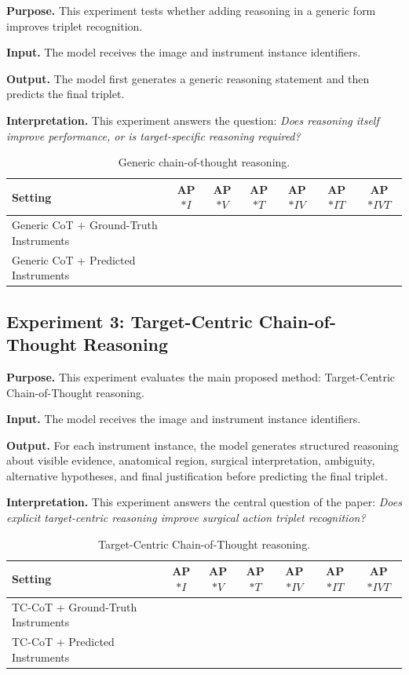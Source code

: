 \documentclass[11pt]{article}
\begin{document}
\textbf{Purpose.}
This experiment tests whether adding reasoning in a generic form improves triplet recognition.

\textbf{Input.}
The model receives the image and instrument instance identifiers.

\textbf{Output.}
The model first generates a generic reasoning statement and then predicts the final triplet.

\textbf{Interpretation.}
This experiment answers the question: \emph{Does reasoning itself improve performance, or is target-specific reasoning required?}

\begin{table}[H]
\centering
\caption{Generic chain-of-thought reasoning.}
\begin{tabular}{lcccccc}
\toprule
Setting & AP$*I$ & AP$*V$ & AP$*T$ & AP$*{IV}$ & AP$*{IT}$ & AP$*{IVT}$ \\
\midrule
Generic CoT + Ground-Truth Instruments & & & & & & \\
Generic CoT + Predicted Instruments & & & & & & \\
\bottomrule
\end{tabular}
\label{tab:generic_cot}
\end{table}

\subsection{Experiment 3: Target-Centric Chain-of-Thought Reasoning}

\textbf{Purpose.}
This experiment evaluates the main proposed method: Target-Centric Chain-of-Thought reasoning.

\textbf{Input.}
The model receives the image and instrument instance identifiers.

\textbf{Output.}
For each instrument instance, the model generates structured reasoning about visible evidence, anatomical region, surgical interpretation, ambiguity, alternative hypotheses, and final justification before predicting the final triplet.

\textbf{Interpretation.}
This experiment answers the central question of the paper: \emph{Does explicit target-centric reasoning improve surgical action triplet recognition?}

\begin{table}[H]
\centering
\caption{Target-Centric Chain-of-Thought reasoning.}
\begin{tabular}{lcccccc}
\toprule
Setting & AP$*I$ & AP$*V$ & AP$*T$ & AP$*{IV}$ & AP$*{IT}$ & AP$*{IVT}$ \\
\midrule
TC-CoT + Ground-Truth Instruments & & & & & & \\
TC-CoT + Predicted Instruments & & & & & & \\
\bottomrule
\end{tabular}
\label{tab:tccot}
\end{table}
\end{document}
